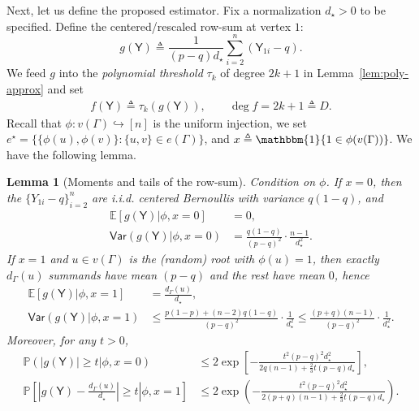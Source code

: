 \documentclass[12pt]{article}
\newcommand{\bE}{\mathbb{E}}
\newtheorem{lemma}{Lemma}
\newcommand{\Ind}{\mathbbm{1}}
\newcommand{\abs}[1]{\left|#1\right|}
\newcommand{\p}[1]{\left(#1\right)}
\newcommand{\pp}[1]{\left[#1\right]}
\newcommand{\s}[1]{\mathsf{#1}}
\begin{document}
Next, let us define the proposed estimator. Fix a normalization $d_\star>0$ to be specified. Define the centered/rescaled row-sum at vertex $1$:
\begin{equation}\label{eq:row-sum-g}
g(\s{Y})\triangleq\frac{1}{(p-q)d_\star}\sum_{i=2}^n\p{\s{Y}_{1i}-q}.
\end{equation}
We feed $g$ into the \emph{polynomial threshold} $\tau_k$ of degree $2k+1$ in Lemma~\ref{lem:poly-approx} and set
\begin{align}
f(\s{Y})\triangleq\tau_k\p{g(\s{Y})},\qquad \deg f=2k+1\triangleq D.
\end{align}
Recall that $\phi:v(\Gamma)\hookrightarrow[n]$ is the uniform injection, we set $e^\star=\{\{\phi(u),\phi(v)\}:\{u,v\}\in e(\Gamma)\}$, and $x\triangleq \Ind\{1\in \phi(v(\Gamma))\}$. We have the following lemma.
\begin{lemma}[Moments and tails of the row-sum]\label{lem:row-moments}
Condition on $\phi$. If $x=0$, then the $\{Y_{1i}-q\}_{i=2}^n$ are i.i.d. centered Bernoullis with variance $q(1-q)$, and
\begin{align}
\bE[g(\s{Y})\vert \phi,x=0]&=0,\\
\s{Var}(g(\s{Y})\vert \phi,x=0)&=\frac{q(1-q)}{(p-q)^2}\cdot\frac{n-1}{d_\star^2}.
\end{align}
If $x=1$ and $u\in v(\Gamma)$ is the (random) root with $\phi(u)=1$, then exactly $d_\Gamma(u)$ summands have mean $(p-q)$ and the rest have mean $0$, hence
\begin{align}
\bE[g(\s{Y})\vert \phi,x=1]&=\frac{d_\Gamma(u)}{d_\star},\\ 
\s{Var}(g(\s{Y})\vert \phi,x=1)&\leq \frac{p(1-p)+(n-2)q(1-q)}{(p-q)^2}\cdot\frac{1}{d_\star^2}\leq\frac{(p+q)(n-1)}{(p-q)^2}\cdot\frac{1}{d_\star^2}.
\end{align}
Moreover, for any $t>0$,
\begin{align}
\mathbb{P}\left(|g(\s{Y})|\ge t\vert\phi,x=0\right)
&\le 2\exp\pp{-\frac{t^2(p-q)^2 d_\star^2}{2q(n-1)+\frac{2}{3}t(p-q)d_\star}},\label{eq:bern-null}\\
\mathbb{P}\pp{\left.\abs{g(\s{Y})-\tfrac{d_\Gamma(u)}{d_\star}}\geq t\right|\phi,x=1}
&\le 2\exp\left(-\frac{t^2(p-q)^2 d_\star^2}{2(p+q)(n-1)+\frac{2}{3}t(p-q)d_\star}\right).\label{eq:bern-planted}
\end{align}
\end{lemma}
\end{document}
